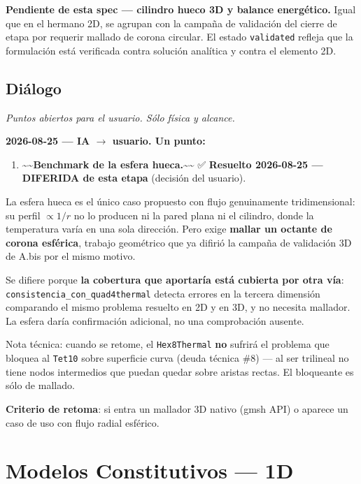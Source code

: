 \documentclass[11pt,letterpaper,oneside]{report}
\begin{document}
\textbf{Pendiente de esta spec --- cilindro hueco 3D y balance energético.} Igual que en el hermano 2D, se agrupan con la campaña de validación del cierre de etapa por requerir mallado de corona circular. El estado \texttt{validated} refleja que la formulación está verificada contra solución analítica y contra el elemento 2D.


\section{Diálogo}

\textit{Puntos abiertos para el usuario. Sólo física y alcance.}

\textbf{2026-08-25 --- IA \ensuremath{\to} usuario. Un punto:}

\begin{enumerate}
  \item \textasciitilde{}\textasciitilde{}\textbf{Benchmark de la esfera hueca.}\textasciitilde{}\textasciitilde{} ✅ \textbf{Resuelto 2026-08-25 --- DIFERIDA de esta etapa} (decisión del usuario).
\end{enumerate}

   La esfera hueca es el único caso propuesto con flujo genuinamente tridimensional: su perfil $\propto 1/r$ no lo producen ni la pared plana ni el cilindro, donde la temperatura varía en una sola dirección. Pero exige \textbf{mallar un octante de corona esférica}, trabajo geométrico que ya difirió la campaña de validación 3D de A.bis por el mismo motivo.

   Se difiere porque \textbf{la cobertura que aportaría está cubierta por otra vía}: \texttt{consistencia\_con\_quad4thermal} detecta errores en la tercera dimensión comparando el mismo problema resuelto en 2D y en 3D, y no necesita mallador. La esfera daría confirmación adicional, no una comprobación ausente.

   Nota técnica: cuando se retome, el \texttt{Hex8Thermal} \textbf{no} sufrirá el problema que bloquea al \texttt{Tet10} sobre superficie curva (deuda técnica \#8) --- al ser trilineal no tiene nodos intermedios que puedan quedar sobre aristas rectas. El bloqueante es sólo de mallado.

   \textbf{Criterio de retoma}: si entra un mallador 3D nativo (gmsh API) o aparece un caso de uso con flujo radial esférico.


\newpage

\chapter{Modelos Constitutivos — 1D}
\end{document}

